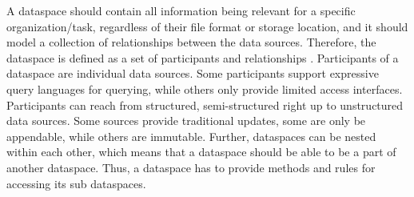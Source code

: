 



A dataspace should contain all information being relevant for a specific organization/task, regardless of their file format or storage location, and it should model a collection of relationships between the data sources. Therefore, the dataspace is defined as a set of participants and relationships \cite[p. 29]{Franklin:2005:DDN:1107499.1107502}. 
Participants of a dataspace are individual data sources. 
Some participants support expressive query languages for querying, while others only provide limited access interfaces. 
Participants can reach from structured, semi-structured right up to unstructured data sources. Some sources provide traditional updates, some are only be appendable, while others are immutable. Further, dataspaces can be nested within each other, which means that a dataspace should be able to be a part of another dataspace.  Thus, a dataspace has to provide methods and rules for accessing its sub dataspaces.

